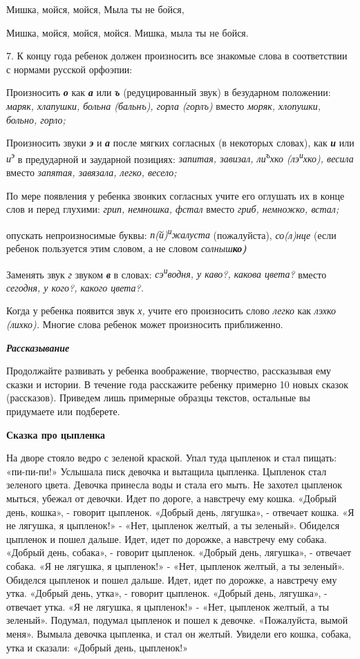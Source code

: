 \documentclass{book}
\renewcommand{\emph}[1]{\textit{#1}}
\begin{document}
Мишка, мойся, мойся, Мыла ты не бойся,

Мишка, мойся, мойся, мойся. Мишка, мыла ты не бойся.

7. К концу года ребенок должен произносить все знакомые слова в
соответствии с нормами русской орфоэпии:

Произносить \emph{\textbf{о}} как \emph{\textbf{а}} или
\emph{\textbf{ъ}} (редуцированный звук) в безударном положении:
\emph{маряк, хлапушки, больна (бальнъ), горла (горлъ)} вместо
\emph{моряк, хлопушки, больно, горло;}

Произносить звуки \emph{\textbf{э}} и \emph{\textbf{а}} после мягких
согласных (в некоторых словах), как \emph{\textbf{и}} или
\emph{и\textsuperscript{э}} в предударной и заударной позициях:
\emph{запитая, завизал, ли\textsuperscript{ъ}хко
(лэ\textsuperscript{и}хко), весила} вместо \emph{запятая, завязала,
легко, весело;}

По мере появления у ребенка звонких согласных учите его оглушать их в
конце слов и перед глухими: \emph{грип, немношка, фстал} вместо
\emph{гриб, немножко, встал;}

опускать непроизносимые буквы: \emph{п(й)\textsuperscript{и}жалуста}
(пожалуйста), \emph{со(л)нце} (если ребенок пользуется этим словом, а не
словом \emph{солныш\textbf{ко)}}

Заменять звук \emph{г} звуком \emph{\textbf{в}} в словах:
\emph{сэ\textsuperscript{и}водня, у каво?, какова цвета?} вместо
\emph{сегодня, у кого?, какого цвета?.}

Когда у ребенка появится звук \emph{х,} учите его произносить слово
\emph{легко} как \emph{лэхко (лихко).} Многие слова ребенок может
произносить приближенно.

\emph{\textbf{Рассказывание}}

Продолжайте развивать у ребенка воображение, творчество, рассказывая ему
сказки и истории. В течение года расскажите ребенку примерно 10 новых
сказок (рассказов). Приведем лишь примерные образцы текстов, остальные
вы придумаете или подберете.

\textbf{Сказка про цыпленка}

На дворе стояло ведро с зеленой краской. Упал туда цыпленок и стал
пищать: «пи-пи-пи!» Услышала писк девочка и вытащила цыпленка. Цыпленок
стал зеленого цвета. Девочка принесла воды и стала его мыть. Не захотел
цыпленок мыться, убежал от девочки. Идет по дороге, а навстречу ему
кошка. «Добрый день, кошка», - говорит цыпленок. «Добрый день, лягушка»,
- отвечает кошка. «Я не лягушка, я цыпленок!» - «Нет, цыпленок желтый, а
ты зеленый». Обиделся цыпленок и пошел дальше. Идет, идет по дорожке, а
навстречу ему собака. «Добрый день, собака», - говорит цыпленок. «Добрый
день, лягушка», - отвечает собака. «Я не лягушка, я цыпленок!» - «Нет,
цыпленок желтый, а ты зеленый». Обиделся цыпленок и пошел дальше. Идет,
идет по дорожке, а навстречу ему утка. «Добрый день, утка», - говорит
цыпленок. «Добрый день, лягушка», - отвечает утка. «Я не лягушка, я
цыпленок!» - «Нет, цыпленок желтый, а ты зеленый». Подумал, подумал
цыпленок и пошел к девочке. «Пожалуйста, вымой меня». Вымыла девочка
цыпленка, и стал он желтый. Увидели его кошка, собака, утка и сказали:
«Добрый день, цыпленок!»
\end{document}
